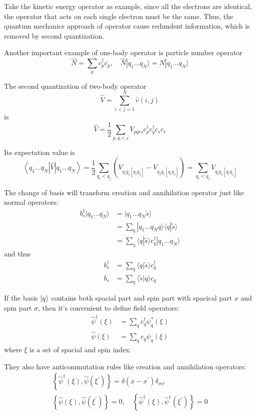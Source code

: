 \documentclass[bachelor, english]{ustcthesis}
\begin{document}
Take the kinetic energy operator as example, since all the electrons are identical, the operator that acts on each single electron must be the same.
Thus, the quantum mechanics approach of operator cause redundent information, which is removed by second quantization.

Another important example of one-body operator is particle number operator
$$
\hat{N}=\sum_{p} c_{p}^{\dagger} c_{p}, \quad \hat{N} | q_{1} \ldots q_{N} \rangle=N | q_{1} \ldots q_{N} \rangle
$$


The second quantization of two-body operator
$$
\hat{V}=\sum_{i<j=1}^{N} \hat{v}(i, j)
$$
is
$$
\hat{V}=\frac{1}{2} \sum_{p, q, r, s} V_{p q r s} c_{p}^{\dagger} c_{q}^{\dagger} c_{s} c_{r}
$$

Its expectation value is
$$
\left\langle q_{1} \ldots q_{N}|\hat{V}| q_{1} \ldots q_{N}\right\rangle=\frac{1}{2} \sum_{q_{i}<q_{j}}\left(V_{q_{i} q_{j}\left[q_{i} q_{j}\right]}-V_{q_{j} q_{i}\left[q_{i} q_{j}\right]}\right)=\sum_{q_{i}<q_{j}} V_{q_{i} q_{j}\left[q_{i} q_{j}\right]}
$$

The change of basis will transform creation and annihilation operator just like normal operators:
$$
\begin{aligned} 
	b_{s}^{\dagger} | q_{1} \ldots q_{N} \rangle&= | q_{1} \ldots q_{N} \tilde{s} \rangle
	\\
	&= \sum_{q} | q_{1} \ldots q_{N} q \rangle\langle q | \tilde{s}\rangle
	\\
	&=\sum_{q}\langle q | \tilde{s}\rangle c_{q}^{\dagger} | q_{1} \ldots q_{N} \rangle
\end{aligned}
$$
and thus
$$
\begin{aligned}
	b_{s}^{\dagger}&=\sum_{q}\langle q | \tilde{s}\rangle c_{q}^{\dagger}
	\\
	b_{s}&=\sum_{q}\langle\tilde{s} | q\rangle c_{q}
\end{aligned}
$$

If the basis $\ket{q}$ contains both spacial part and spin part with spacical part $x$ and spin part $\sigma$, then it's convenient to define field operators:
$$
\begin{aligned} \hat{\psi}^{\dagger}(\xi) &=\sum_{q} c_{q}^{\dagger} \psi_{q}^{*}(\xi) \\ \hat{\psi}(\xi) &=\sum_{q} c_{q} \psi_{q}(\xi) \end{aligned}
$$
where $\xi$ is a set of spacial and spin index.

They also have anticommutation rules like creation and annihilation operators:
$$
\begin{array}{c}{\left\{\hat{\psi}^{\dagger}(\xi), \hat{\psi}\left(\xi^{\prime}\right)\right\}=\delta\left(x-x^{\prime}\right) \delta_{\sigma \sigma^{\prime}}} \\ {\left\{\hat{\psi}(\xi), \hat{\psi}\left(\xi^{\prime}\right)\right\}=0, \quad\left\{\hat{\psi}^{\dagger}(\xi), \hat{\psi}^{\dagger}\left(\xi^{\prime}\right)\right\}=0}\end{array}
$$
\end{document}
